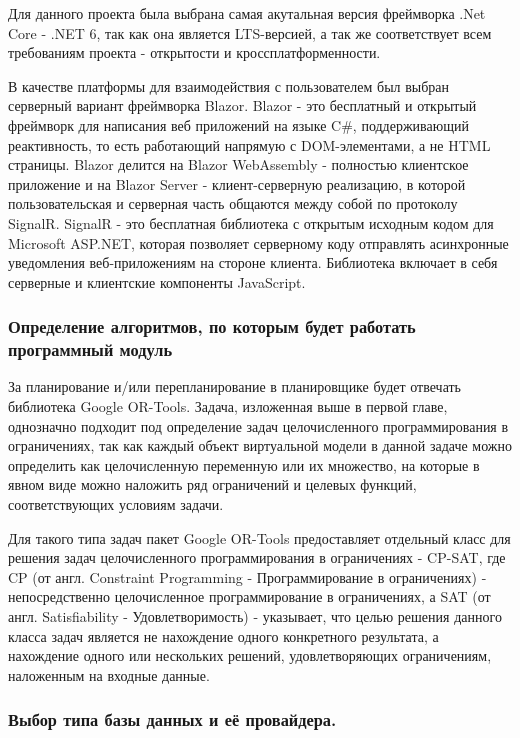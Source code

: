 Для данного проекта была выбрана самая акутальная версия фреймворка .Net Core - .NET 6, так как она является LTS-версией, а так же соответствует всем требованиям проекта - открытости и кроссплатформенности.

В качестве платформы для взаимодействия с пользователем был выбран серверный вариант фреймворка Blazor. Blazor - это бесплатный и открытый фреймворк для написания веб приложений на языке C\#, поддерживающий реактивность, то есть работающий напрямую с DOM-элементами, а не HTML страницы. Blazor делится на Blazor WebAssembly - полностью клиентское приложение и на Blazor Server - клиент-серверную реализацию, в которой пользовательская и серверная часть общаются между собой по протоколу SignalR. SignalR - это бесплатная библиотека с открытым исходным кодом для Microsoft ASP.NET, которая позволяет серверному коду отправлять асинхронные уведомления веб-приложениям на стороне клиента. Библиотека включает в себя серверные и клиентские компоненты JavaScript.



\subsubsection{Определение алгоритмов, по которым будет работать программный модуль}

За планирование и/или перепланирование в планировщике будет отвечать библиотека Google OR-Tools. Задача, изложенная выше в первой главе, однозначно подходит под определение задач целочисленного программирования в ограничениях, так как каждый объект виртуальной модели в данной задаче можно определить как целочисленную переменную или их множество, на которые в явном виде можно наложить ряд ограничений и целевых функций, соответствующих условиям задачи.

Для такого типа задач пакет Google OR-Tools предоставляет отдельный класс для решения задач целочисленного программирования в ограничениях - CP-SAT, где CP (от англ. Constraint Programming - Программирование в ограничениях) - непосредственно целочисленное программирование в ограничениях, а SAT (от англ. Satisfiability - Удовлетворимость) - указывает, что целью решения данного класса задач является не нахождение одного конкретного результата, а нахождение одного или нескольких решений, удовлетворяющих ограничениям, наложенным на входные данные.
 
\subsubsection{Выбор типа базы данных и её провайдера.}

